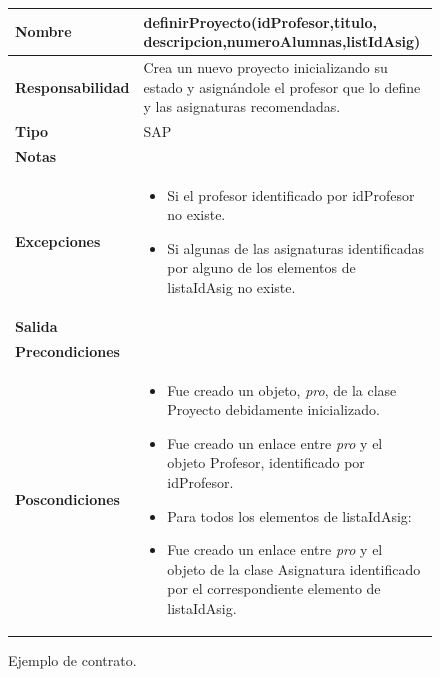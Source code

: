 \documentclass[12pt,spanish]{article}
\begin{document}
\begin{figure}[H]
\centering
\begin{tabular}{|m{7.5cm}|m{7.5cm}|}
\hline
\textbf{Nombre} & \textbf{definirProyecto}(idProfesor,titulo,
descripcion,numeroAlumnas,listIdAsig)\\
\hline
\textbf{Responsabilidad} & Crea un nuevo proyecto inicializando su estado y asignándole el profesor que lo define y las asignaturas recomendadas.\\
\hline
\textbf{Tipo} & SAP\\
\hline
\textbf{Notas} &  \\
\hline
\textbf{Excepciones} & 
\begin{itemize}
	\item Si el profesor identificado por idProfesor no existe.
	\item Si algunas de las asignaturas identificadas por alguno de los elementos de listaIdAsig no existe.
\end{itemize} \\
\hline
\textbf{Salida} &\\
\hline
\textbf{Precondiciones} & \\
\hline
\textbf{Poscondiciones} & 
\begin{itemize}
	\item Fue creado un objeto, \emph{pro}, de la clase Proyecto debidamente inicializado.
	\item Fue creado un enlace entre \emph{pro} y el objeto Profesor, identificado por idProfesor.
	\item Para todos los elementos de 
	listaIdAsig:
	\item \quad Fue creado un enlace entre \emph{pro} y el objeto de la clase Asignatura identificado por el correspondiente elemento de listaIdAsig.
\end{itemize}
\\
\hline
\end{tabular}
\caption{Ejemplo de contrato.}
\end{figure}
\end{document}
